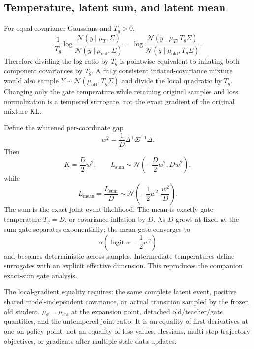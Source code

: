 \documentclass[11pt,a4paper]{article}
\newcommand{\N}{\mathcal{N}}
\DeclareMathOperator{\logit}{logit}
\theoremstyle{plain}
\theoremstyle{definition}
\begin{document}
\subsection{Temperature, latent sum, and latent mean}

For equal-covariance Gaussians and $T_g>0$,
\begin{equation}
\frac{1}{T_g}
\log\frac{\N(y\mid\mu_T,\Sigma)}
         {\N(y\mid\mu_{\mathrm{old}},\Sigma)}
=
\log\frac{\N(y\mid\mu_T,T_g\Sigma)}
         {\N(y\mid\mu_{\mathrm{old}},T_g\Sigma)}.
\label{eq:a3-temperature-covariance}
\end{equation}
Therefore dividing the log ratio by $T_g$ is pointwise equivalent to inflating both component
covariances by $T_g$.  A fully consistent inflated-covariance mixture would also sample
$Y\sim\N(\mu_{\mathrm{old}},T_g\Sigma)$ and divide the local quadratic by $T_g$.  Changing only
the gate temperature while retaining original samples and loss normalization is a tempered
surrogate, not the exact gradient of the original mixture KL.

Define the whitened per-coordinate gap
\begin{equation}
w^2
=
\frac1D
\Delta^\top\Sigma^{-1}\Delta .
\label{eq:a3-whitened-rms}
\end{equation}
Then
\begin{equation}
K=\frac{D}{2}w^2,
\qquad
L_{\mathrm{sum}}
\sim
\N\!\left(-\frac{D}{2}w^2,Dw^2\right),
\label{eq:a3-sum-law}
\end{equation}
while
\begin{equation}
L_{\mathrm{mean}}
=\frac{L_{\mathrm{sum}}}{D}
\sim
\N\!\left(-\frac12w^2,\frac{w^2}{D}\right).
\label{eq:a3-mean-law}
\end{equation}
The sum is the exact joint event likelihood.  The mean is exactly gate temperature $T_g=D$, or
covariance inflation by $D$.  As $D$ grows at fixed $w$, the sum gate separates exponentially;
the mean gate converges to
\begin{equation}
\sigma\!\left(\logit\alpha-\frac12w^2\right)
\label{eq:a3-mean-limit}
\end{equation}
and becomes deterministic across samples.  Intermediate temperatures define surrogates with an
explicit effective dimension.  This reproduces the companion exact-sum gate analysis.

\begin{tcolorbox}[colback=red!4,colframe=red!45!black,title=Exact boundary of Arm A3]
The local-gradient equality requires: the same complete latent event, positive shared
model-independent covariance, an actual transition sampled by the frozen old student,
$\mu_\theta=\mu_{\mathrm{old}}$ at the expansion point, detached old/teacher/gate quantities, and
the untempered joint ratio.  It is an equality of first derivatives at one on-policy point, not
an equality of loss values, Hessians, multi-step trajectory objectives, or gradients after
multiple stale-data updates.
\end{tcolorbox}
\end{document}
